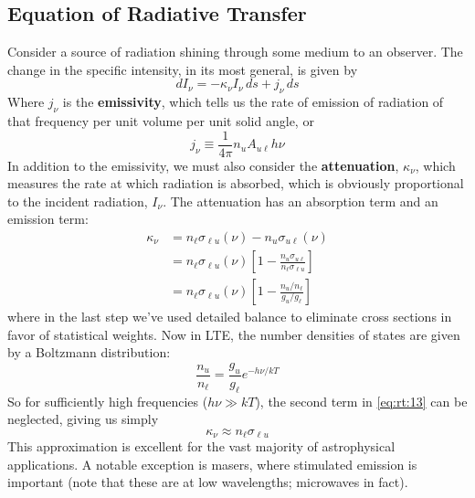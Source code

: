 \documentclass[10pt]{article}
\numberwithin{equation}{section}
\begin{document}
\subsection{Equation of Radiative Transfer} %
\label{sub:equation_of_radiative_transfer}
Consider a source of radiation shining through some medium to an observer. The
change in the specific intensity, in its most general, is given by
\begin{equation}
  \label{eq:rt:9} dI_\nu = -\kappa_\nu I_\nu\,ds + j_\nu\,ds
\end{equation}
Where $j_\nu$ is the \textbf{emissivity}, which tells us the rate of emission
of radiation of that frequency per unit volume per unit solid angle, or
\begin{equation}
  \label{eq:rt:10} j_\nu \equiv \frac{1}{4\pi} n_u A_{u\ell}h\nu
\end{equation}
In addition to the emissivity, we must also consider the \textbf{attenuation},
$\kappa_\nu$, which measures the rate at which radiation is absorbed, which is
obviously proportional to the incident radiation, $I_\nu$. The attenuation has
an absorption term and an emission term:
\begin{align}
  \label{eq:rt:11} \kappa_\nu &= n_\ell\sigma_{\ell u}(\nu) -
  n_u\sigma_{u\ell}(\nu)\\
  \label{eq:rt:12} &= n_\ell \sigma_{\ell u}(\nu)\left[1 - \frac{n_u \sigma_{u
  \ell}}{n_\ell \sigma_{\ell u}}\right]\\
  \label{eq:rt:13} &= n_\ell \sigma_{\ell u}(\nu)\left[1 -
  \frac{n_u/n_\ell}{g_u/g_{\ell}}\right]
\end{align}
where in the last step we've used detailed balance to eliminate cross sections
in favor of statistical weights. Now in LTE, the number densities of states are
given by a Boltzmann distribution:
\begin{equation}
  \label{eq:rt:14} \frac{n_u}{n_\ell} = \frac{g_u}{g_\ell} e^{-h\nu/kT}
\end{equation}
So for sufficiently high frequencies ($h\nu \gg kT$), the second term in
\eqref{eq:rt:13} can be neglected, giving us simply
\begin{equation}
  \label{eq:rt:15} \kappa_\nu \approx n_\ell \sigma_{\ell u}
\end{equation}
This approximation is excellent for the vast majority of astrophysical
applications. A notable exception is masers, where stimulated emission is
important (note that these are at low wavelengths; microwaves in fact).
\end{document}
